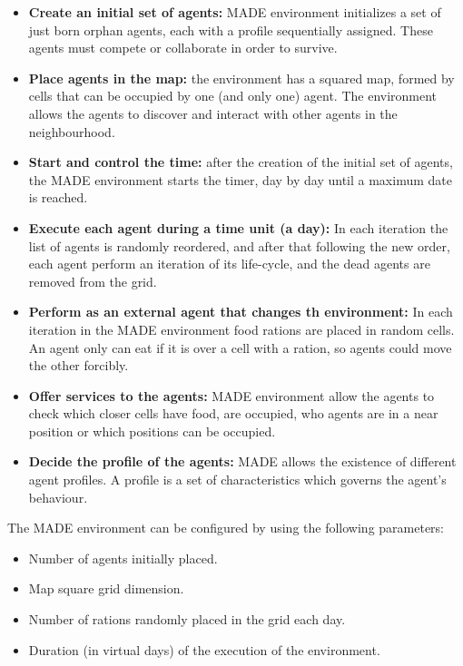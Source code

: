 \documentclass[runningheads]{llncs}
\begin{document}
\begin{itemize}
\item \textbf{Create an initial set of agents:} MADE environment
  initializes a set of just born orphan agents, each with a profile
  sequentially assigned. %
 These agents must compete or collaborate in order to survive.
\item \textbf{Place agents in the map:} the environment has a squared map, formed by cells that can be occupied by one (and only one) agent. The environment allows the agents to discover and interact with other agents in the neighbourhood.
\item \textbf{Start and control the time:} after the creation of the initial set of agents, the MADE environment starts the timer, day by day until a maximum date is reached.
\item \textbf{Execute each agent during a time unit (a day):} In each iteration the list of agents is randomly reordered, and after that following the new order, each agent perform an iteration of its life-cycle, and the dead agents are removed from the grid.
\item \textbf{Perform as an external agent that changes th environment:} In each iteration in the MADE environment food rations are placed in random cells. An agent only can eat if it is over a cell with a ration, so agents could move the other forcibly.
\item \textbf{Offer services to the agents:} MADE environment allow the agents to check which closer cells have food, are occupied, who agents are in a near position or which positions can be occupied.
\item \textbf{Decide the profile of the agents:} MADE allows the existence of different agent profiles. A profile is a set of characteristics which governs the agent's behaviour.
\end{itemize}

The MADE environment can be configured by using the following parameters:


\begin{itemize}
\item Number of agents initially placed.
\item Map square grid dimension.
\item Number of rations randomly placed in the grid each day.
\item Duration (in virtual days) of the  execution of the environment.
\end{itemize}
\end{document}
